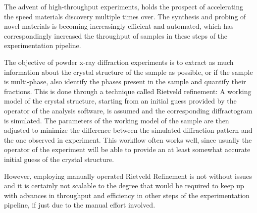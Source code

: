 








The advent of high-throughput experiments, holds the prospect of accelerating the speed materials discovery multiple times over.
The synthesis and probing of novel materials is becoming increasingly efficient and automated,
which has correspondingly increased the throughput of samples in these steps
of the experimentation pipeline.




The objective of powder x-ray diffraction experiments is to extract as much information about the crystal structure
of the sample as possible, or if the sample is multi-phase, also identify the phases present in the sample and quantify
their fractions.
This is done through a technique called Rietveld refinement: A working model of the crystal structure, starting
from an initial guess provided by the operator of the analysis software, is assumed and the corresponding diffractogram
is simulated.
The parameters of the working model of the sample are then adjusted to minimize the difference between the simulated
diffraction pattern and the one observed in experiment.
This workflow often works well, since usually the operator of the experiment will be able
to provide an at least somewhat accurate initial guess of the crystal structure.

However, employing manually operated Rietveld Refinement is not without issues and it is certainly not
scalable to the degree that would be required to keep up with advances
in throughput and efficiency in other steps of the experimentation pipeline, if just due to the manual effort involved.

